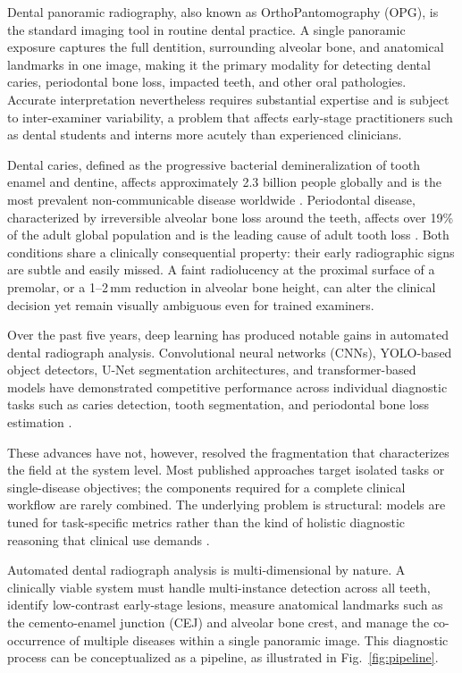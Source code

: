 \documentclass[conference]{IEEEtran}
\begin{document}
Dental panoramic radiography, also known as OrthoPantomography (OPG),
is the standard imaging tool in routine dental practice. A single
panoramic exposure captures the full dentition, surrounding alveolar
bone, and anatomical landmarks in one image, making it the primary
modality for detecting dental caries, periodontal bone loss, impacted
teeth, and other oral pathologies. Accurate interpretation nevertheless
requires substantial expertise and is subject to inter-examiner
variability, a problem that affects early-stage practitioners such as
dental students and interns more acutely than experienced clinicians.

Dental caries, defined as the progressive bacterial demineralization of
tooth enamel and dentine, affects approximately 2.3 billion people
globally and is the most prevalent non-communicable disease worldwide
\cite{luke2025accuracy}. Periodontal disease, characterized by
irreversible alveolar bone loss around the teeth, affects over 19\% of
the adult global population and is the leading cause of adult tooth
loss \cite{khubrani2025detection}. Both conditions share a clinically
consequential property: their early radiographic signs are subtle and
easily missed. A faint radiolucency at the proximal surface of a
premolar, or a 1--2\,mm reduction in alveolar bone height, can alter
the clinical decision yet remain visually ambiguous even for trained
examiners.

Over the past five years, deep learning has produced notable gains in
automated dental radiograph analysis. Convolutional neural networks
(CNNs), YOLO-based object detectors, U-Net segmentation architectures,
and transformer-based models have demonstrated competitive performance
across individual diagnostic tasks such as caries detection, tooth
segmentation, and periodontal bone loss estimation
\cite{nassiri2025yolo,jundaeng2025advanced,bhoopalan2026self}.

These advances have not, however, resolved the fragmentation that
characterizes the field at the system level. Most published approaches
target isolated tasks or single-disease objectives; the components
required for a complete clinical workflow are rarely combined. The
underlying problem is structural: models are tuned for task-specific
metrics rather than the kind of holistic diagnostic reasoning that
clinical use demands \cite{zanini2024systematic,muresanu2024automating}.

Automated dental radiograph analysis is multi-dimensional by nature. A
clinically viable system must handle multi-instance detection across all
teeth, identify low-contrast early-stage lesions, measure anatomical
landmarks such as the cemento-enamel junction (CEJ) and alveolar bone
crest, and manage the co-occurrence of multiple diseases within a single
panoramic image. This diagnostic process can be
conceptualized as a pipeline, as illustrated in Fig.~\ref{fig:pipeline}.
\end{document}
